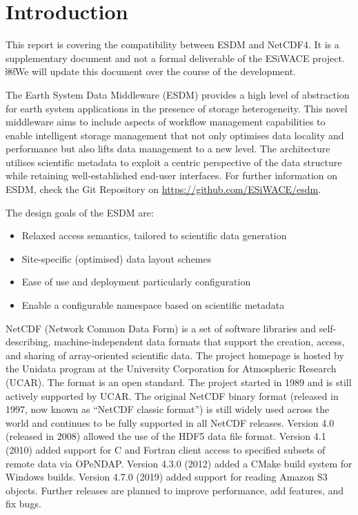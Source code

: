 \chapter{Introduction}
\label{ch:intro}


This report is covering the compatibility between ESDM and NetCDF4.
It is a supplementary document and not a formal deliverable of the ESiWACE project.
￼We will update this document over the course of the development.

The Earth System Data Middleware (ESDM) provides a high level of abstraction for earth system applications in the presence of storage heterogeneity. This novel middleware aims to include aspects of workflow management capabilities to enable intelligent storage management that not only optimises data locality and performance but also lifts data management to a new level. The architecture utilises scientific metadata to exploit a centric perspective of the data structure while retaining well-established end-user interfaces. For further information on ESDM, check the Git Repository on \url{https://github.com/ESiWACE/esdm}.

The design goals of the ESDM are:

\begin{itemize}

\item Relaxed access semantics, tailored to scientific data generation

\item Site-specific (optimised) data layout schemes

\item Ease of use and deployment particularly configuration

\item Enable a configurable namespace based on scientific metadata

\end{itemize}

NetCDF (Network Common Data Form) is a set of software libraries and self-describing, machine-independent data formats that support the creation, access, and sharing of array-oriented scientific data. The project homepage is hosted by the Unidata program at the University Corporation for Atmospheric Research (UCAR). The format is an open standard. The project started in 1989 and is still actively supported by UCAR. The original NetCDF binary format (released in 1997, now known as ``NetCDF classic format'') is still widely used across the world and continues to be fully supported in all NetCDF releases. Version 4.0 (released in 2008) allowed the use of the HDF5 data file format. Version 4.1 (2010) added support for C and Fortran client access to specified subsets of remote data via OPeNDAP. Version 4.3.0 (2012) added a CMake build system for Windows builds. Version 4.7.0 (2019) added support for reading Amazon S3 objects. Further releases are planned to improve performance, add features, and fix bugs.

